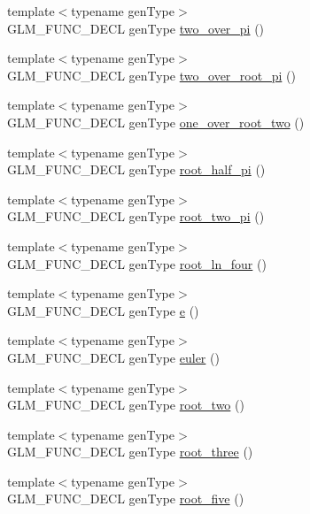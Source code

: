 \begin{CompactItemize}
\item 
{\footnotesize template$<$typename genType$>$ }\\GLM\_\-FUNC\_\-DECL genType \hyperlink{group__gtc__constants_g3b92bf25d756f2d34a531394146decbf}{two\_\-over\_\-pi} ()
\item 
{\footnotesize template$<$typename genType$>$ }\\GLM\_\-FUNC\_\-DECL genType \hyperlink{group__gtc__constants_g542f9a504c7cf25b6c0108adb4a9f97a}{two\_\-over\_\-root\_\-pi} ()
\item 
{\footnotesize template$<$typename genType$>$ }\\GLM\_\-FUNC\_\-DECL genType \hyperlink{group__gtc__constants_g59e3cc61460e0c503d80df6e70aa38b0}{one\_\-over\_\-root\_\-two} ()
\item 
{\footnotesize template$<$typename genType$>$ }\\GLM\_\-FUNC\_\-DECL genType \hyperlink{group__gtc__constants_g39bda21134486f771067238aa263c562}{root\_\-half\_\-pi} ()
\item 
{\footnotesize template$<$typename genType$>$ }\\GLM\_\-FUNC\_\-DECL genType \hyperlink{group__gtc__constants_g030fc8d3f9b605ce3d21dba058c930dd}{root\_\-two\_\-pi} ()
\item 
{\footnotesize template$<$typename genType$>$ }\\GLM\_\-FUNC\_\-DECL genType \hyperlink{group__gtc__constants_g0f121de1b70ce7379c08f47291efdb49}{root\_\-ln\_\-four} ()
\item 
{\footnotesize template$<$typename genType$>$ }\\GLM\_\-FUNC\_\-DECL genType \hyperlink{group__gtc__constants_g2425b9c6a54d9d91fd1a634700e85cf1}{e} ()
\item 
{\footnotesize template$<$typename genType$>$ }\\GLM\_\-FUNC\_\-DECL genType \hyperlink{group__gtc__constants_g99cfc0dd627ebc20b51d3c9c0f706c6a}{euler} ()
\item 
{\footnotesize template$<$typename genType$>$ }\\GLM\_\-FUNC\_\-DECL genType \hyperlink{group__gtc__constants_g7e985cdcc68d42d833072d09cac683dc}{root\_\-two} ()
\item 
{\footnotesize template$<$typename genType$>$ }\\GLM\_\-FUNC\_\-DECL genType \hyperlink{group__gtc__constants_g2d2fec6ccd7b739e797e402521780fe3}{root\_\-three} ()
\item 
{\footnotesize template$<$typename genType$>$ }\\GLM\_\-FUNC\_\-DECL genType \hyperlink{group__gtc__constants_gfa2f8c1bc0e6684652171820d9140d3e}{root\_\-five} ()

\end{CompactItemize}
